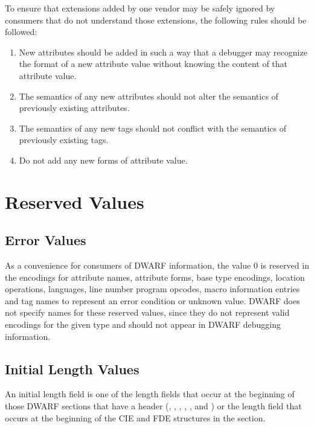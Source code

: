 To ensure that extensions added by one vendor may be safely
ignored by consumers that do not understand those extensions,
the following rules should be followed:

\begin{enumerate}[1.]
\item New attributes should be added in such a way that a
debugger may recognize the format of a new attribute value
without knowing the content of that attribute value.

\item The semantics of any new attributes should not alter
the semantics of previously existing attributes.

\item The semantics of any new tags should not conflict with
the semantics of previously existing tags.

\item Do not add any new forms of attribute value.

\end{enumerate}


\section{Reserved Values}
\label{datarep:reservedvalues}
\subsection{Error Values}
\label{datarep:errorvalues}

As a convenience for consumers of DWARF information, the value
0 is reserved in the encodings for attribute names, attribute
forms, base type encodings, location operations, languages,
line number program opcodes, macro information entries and tag
names to represent an error condition or unknown value. DWARF
does not specify names for these reserved values, since they
do not represent valid encodings for the given type and should
not appear in DWARF debugging information.


\subsection{Initial Length Values}
\label{datarep:initiallengthvalues}

An initial length field is one of the length fields that occur
at the beginning of those DWARF sections that have a header
(, 
, 
, 
,
, and 
) or the length field
that occurs at the beginning of the CIE and FDE structures
in the  section.

